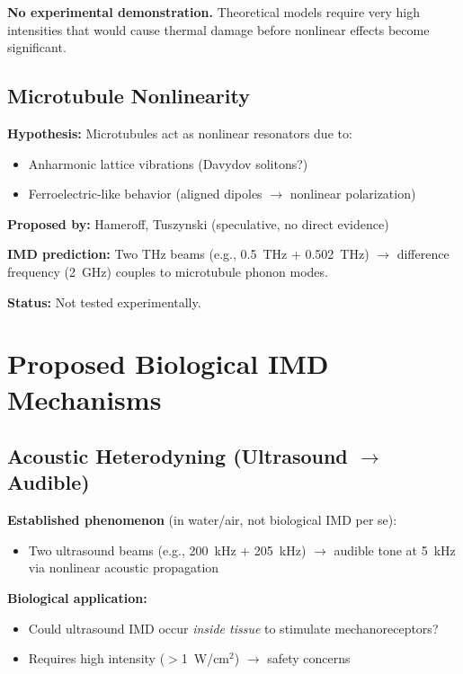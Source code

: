 \begin{warningbox}
\textbf{No experimental demonstration.} Theoretical models require very high intensities that would cause thermal damage before nonlinear effects become significant.
\end{warningbox}

\subsection{Microtubule Nonlinearity}

\textbf{Hypothesis:} Microtubules act as nonlinear resonators due to:
\begin{itemize}
\item Anharmonic lattice vibrations (Davydov solitons?)
\item Ferroelectric-like behavior (aligned dipoles $\rightarrow$ nonlinear polarization)
\end{itemize}

\textbf{Proposed by:} Hameroff, Tuszynski (speculative, no direct evidence)

\textbf{IMD prediction:} Two THz beams (e.g., 0.5~THz + 0.502~THz) $\rightarrow$ difference frequency (2~GHz) couples to microtubule phonon modes.

\textbf{Status:} Not tested experimentally.

\section{Proposed Biological IMD Mechanisms}

\subsection{Acoustic Heterodyning (Ultrasound $\rightarrow$ Audible)}

\textbf{Established phenomenon} (in water/air, not biological IMD per se):
\begin{itemize}
\item Two ultrasound beams (e.g., 200~kHz + 205~kHz) $\rightarrow$ audible tone at 5~kHz via nonlinear acoustic propagation
\end{itemize}

\textbf{Biological application:}
\begin{itemize}
\item Could ultrasound IMD occur \emph{inside tissue} to stimulate mechanoreceptors?
\item Requires high intensity ($>$1~W/cm$^2$) $\rightarrow$ safety concerns
\end{itemize}

